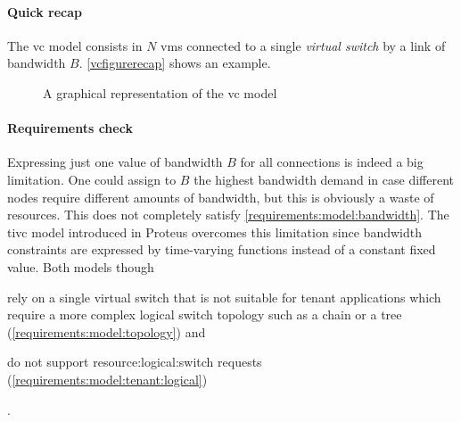 \paragraph{Quick recap}
The \gls{vc} model consists in $N$ \glspl{vm} connected to a single \textit{virtual switch} by a link of bandwidth $B$.
\autoref{vcfigurerecap} shows an example.

\begin{figure}[!htb]
    \centering
    \usebox{\vcfigure}
    \caption{A graphical representation of the \gls{vc} model}
    \label{vcfigurerecap}
\end{figure}

\paragraph{Requirements check}
Expressing just one value of bandwidth $B$ for all connections is indeed a big limitation.
One could assign to $B$ the highest bandwidth demand in case different nodes require different amounts of bandwidth, but this is obviously a waste of resources.
This does not completely satisfy \xmark \ref{requirements:model:bandwidth}.
The \gls{tivc} model introduced in Proteus \cite{proteus} overcomes this limitation since bandwidth constraints are expressed by time-varying functions instead of a constant fixed value.
Both models though 
\begin{mylist}
    \item rely on a single virtual switch that is not suitable for tenant applications which require a more complex logical switch topology such as a chain or a tree (\xmark \ref{requirements:model:topology}) and
    \item do not support \gls{resource:logical:switch} requests (\xmark \ref{requirements:model:tenant:logical})
\end{mylist}.

\begin{comment}
    \paragraph{A possible modification}
    Since specifying the same bandwidth demand $B$ for all \glspl{vm} is restrictive, one trivial solution could consist in allowing the model to specify different values of $B$, like depicted in \autoref{fig:vcmod}.
    
    \begin{figure}[!htb]
        \centering
        \usebox{\vcmodfigure}
        \caption{A possible \gls{vc} variant}
        \label{fig:vcmod}
    \end{figure}
    
    Still, the one-level tree topology remains a problem for those applications which require a more complex logical switch topology: regarding this, a natural \gls{vc} extension is the \gls{voc} model, hence leaving aside the former model in favor of the latter one.
\end{comment}